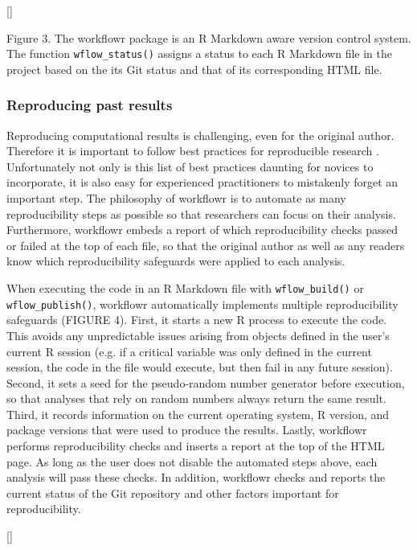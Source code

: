 \documentclass[9pt,a4paper]{extarticle}
\begin{document}
[]

Figure 3. The workflowr package is an R Markdown aware version control
system. The function \verb|wflow_status()| assigns a status to each R Markdown
file in the project based on the its Git status and that of its
corresponding HTML file.

\subsubsection*{Reproducing past results}

Reproducing computational results is challenging, even for the original
author. Therefore it is important to follow best practices for
reproducible research \cite{Sandve2013, Wilson2014a, Wilson2017}.
Unfortunately not only is this list of best practices daunting for
novices to incorporate, it is also easy for experienced practitioners to
mistakenly forget an important step. The philosophy of workflowr is to
automate as many reproducibility steps as possible so that researchers
can focus on their analysis. Furthermore, workflowr embeds a report of
which reproducibility checks passed or failed at the top of each file,
so that the original author as well as any readers know which
reproducibility safeguards were applied to each analysis.

When executing the code in an R Markdown file with \verb|wflow_build()| or
\verb|wflow_publish()|, workflowr automatically implements multiple
reproducibility safeguards (FIGURE 4). First, it starts a new R process
to execute the code. This avoids any unpredictable issues arising from
objects defined in the user’s current R session (e.g. if a critical
variable was only defined in the current session, the code in the file
would execute, but then fail in any future session). Second, it sets a
seed for the pseudo-random number generator before execution, so that
analyses that rely on random numbers always return the same result.
Third, it records information on the current operating system, R
version, and package versions that were used to produce the results.
Lastly, workflowr performs reproducibility checks and inserts a report
at the top of the HTML page. As long as the user does not disable the
automated steps above, each analysis will pass these checks. In
addition, workflowr checks and reports the current status of the Git
repository and other factors important for reproducibility.

[]
\end{document}
